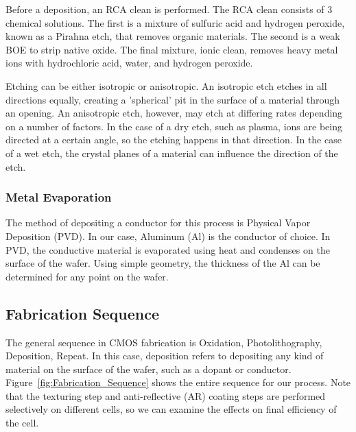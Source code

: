 \documentclass[letter,12pt]{article}
\begin{document}
			Before a deposition, an RCA clean is performed. The RCA clean consists of 3 chemical solutions.  The first is a mixture of sulfuric acid and hydrogen peroxide, known as a Pirahna etch, that removes organic materials.  The second is a weak BOE to strip native oxide.  The final mixture, ionic clean, removes heavy metal ions with hydrochloric acid, water, and hydrogen peroxide. \cite{407_Lab_Manual}
			
			Etching can be either isotropic or anisotropic.  An isotropic etch etches in all directions equally, creating a 'spherical' pit in the surface of a material through an opening.  An anisotropic etch, however, may etch at differing rates depending on a number of factors.  In the case of a dry etch, such as plasma, ions are being directed at a certain angle, so the etching happens in that direction.  In the case of a wet etch, the crystal planes of a material can influence the direction of the etch.
		
		\subsubsection{Metal Evaporation}
			The method of depositing a conductor for this process is Physical Vapor Deposition (PVD). In our case, Aluminum (Al) is the conductor of choice. In PVD, the conductive material is evaporated using heat and condenses on the surface of the wafer.  Using simple geometry, the thickness of the Al can be determined for any point on the wafer.			
		
	\subsection{Fabrication Sequence}
		\FloatBarrier
		The general sequence in CMOS fabrication is Oxidation, Photolithography, Deposition, Repeat. In this case, deposition refers to depositing any kind of material on the surface of the wafer, such as a dopant or conductor. Figure~\ref{fig:Fabrication_Sequence} shows the entire sequence for our process. Note that the texturing step and anti-reflective (AR) coating steps are performed selectively on different cells, so we can examine the effects on final efficiency of the cell.
\end{document}
